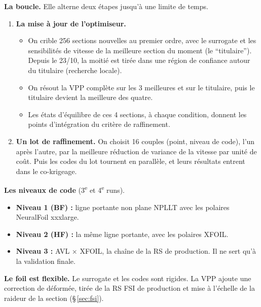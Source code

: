 \documentclass[10pt,a4paper]{article}
\begin{document}
\textbf{La boucle.} Elle alterne deux étapes jusqu'à une limite de temps.
\begin{enumerate}
  \item \textbf{La mise à jour de l'optimiseur.}
        \begin{itemize}
          \item On crible 256 sections nouvelles au premier ordre, avec le surrogate et les sensibilités de
                vitesse de la meilleure section du moment (le \enquote{titulaire}). Depuis le 23/10, la
                moitié est tirée dans une région de confiance autour du titulaire (recherche locale).
          \item On résout la VPP complète sur les 3 meilleures et sur le titulaire, puis le titulaire devient
                la meilleure des quatre.
          \item Les états d'équilibre de ces 4 sections, à chaque condition, donnent les points
                d'intégration du critère de raffinement.
        \end{itemize}
  \item \textbf{Un lot de raffinement.} On choisit 16 couples (point, niveau de code), l'un après l'autre,
        par la meilleure réduction de variance de la vitesse par unité de coût. Puis les codes du lot
        tournent en parallèle, et leurs résultats entrent dans le co-krigeage.
\end{enumerate}

\textbf{Les niveaux de code} (3\textsuperscript{e} et 4\textsuperscript{e} runs).
\begin{itemize}
  \item \textbf{Niveau 1 (BF) :} ligne portante non plane NPLLT avec les polaires NeuralFoil xxxlarge.
  \item \textbf{Niveau 2 (HF) :} la même ligne portante, avec les polaires XFOIL.
  \item \textbf{Niveau 3 :} AVL × XFOIL, la chaîne de la RS de production. Il ne sert qu'à la validation finale.
\end{itemize}

\textbf{Le foil est flexible.} Le surrogate et les codes sont rigides. La VPP ajoute une correction de
déformée, tirée de la RS FSI de production et mise à l'échelle de la raideur de la section (§\,\ref{sec:fsi}).
\end{document}
